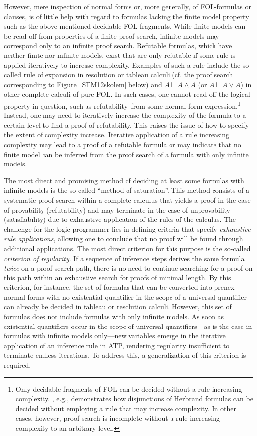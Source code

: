 \documentclass[%
  manuscript=article,   %
  year=2024,
  volume=77,
  doi=10.59203/zfn.77.694,
]{zfn}
\begin{document}
However, mere inspection of normal forms or, more generally, of FOL-formulas or clauses, is of little help with regard to formulas lacking the finite model property such as the above mentioned decidable FOL-fragments. While finite models can be read off from properties of a finite proof search, infinite models may correspond only to an infinite proof search. Refutable formulas, which have neither finite nor infinite models, exist that are only refutable if some rule is applied iteratively to increase complexity. Examples of such a rule include the so-called rule of expansion in resolution or tableau calculi (cf. the proof search corresponding to Figure~\ref{STM12skolem} below) and $A \vdash A \wedge A$ (or $A \vdash A \vee A$) in other complete calculi of pure FOL. In such cases, one cannot read off the logical property in question, such as refutability, from some normal form expression.\footnote{Only decidable fragments of FOL can be decided without a rule increasing complexity. \parencite{Lampert1}, e.g., demonstrates how disjunctions of Herbrand formulas can be decided without employing a rule that may increase complexity. In other cases, however, proof search is incomplete without a rule increasing complexity to an arbitrary level.} Instead, one may need to iteratively increase the complexity of the formula to a certain level to find a proof of refutability. This raises the issue of how to specify the extent of  complexity increase.
Iterative application of a rule increasing complexity may lead to a proof of a refutable formula or may indicate that no finite model can be inferred from the proof search of a formula with only infinite models.

The most direct and promising method of deciding at least some formulas with infinite models is the so-called ``method of saturation''. This method consists of a systematic proof search within a complete calculus that yields a proof in the case of provability (refutability) and may terminate in the case of unprovability (satisfiability) due to exhaustive application of the rules of the calculus. The challenge for the logic programmer lies in defining criteria that specify \emph{exhaustive rule applications}, allowing one to conclude that no proof will be found through additional applications. The most direct criterion for this purpose is the so-called \emph{criterion of regularity}. If a sequence of inference steps derives the same formula \emph{twice} on a proof search path, there is no need to continue searching for a proof on this path within an exhaustive search for proofs of minimal length. By this criterion, for instance, the set of formulas that can be converted into prenex normal forms with no existential quantifier in the scope of a universal quantifier can already be decided in tableau or resolution calculi. However, this set of formulas does not include formulas with only infinite models. 
As soon as existential quantifiers occur in the scope of universal quantifiers---as is the case in formulas with infinite models only---new variables emerge in the iterative application of an inference rule in ATP, rendering regularity insufficient to terminate endless iterations.
To address this, a generalization of this criterion is required.
\end{document}
